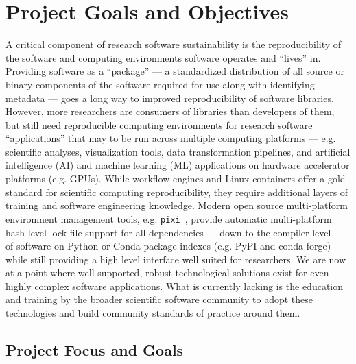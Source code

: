 \documentclass[letterpaper, 11pt]{article}
\newcommand{\pixi}{\texttt{pixi}}
\begin{document}
\pagestyle{fancy}

\section{Project Goals and Objectives}



A critical component of research software sustainability is the reproducibility of the software and computing environments software operates and ``lives'' in.
Providing software as a ``package'' --- a standardized distribution of all source or binary components of the software required for use along with identifying metadata --- goes a long way to improved reproducibility of software libraries.
However, more researchers are consumers of libraries than developers of them, but still need reproducible computing environments for research software ``applications'' that may to be run across multiple computing platforms --- e.g. scientific analyses, visualization tools, data transformation pipelines, and artificial intelligence (AI) and machine learning (ML) applications on hardware accelerator platforms (e.g. GPUs).
While workflow engines and Linux containers offer a gold standard for scientific computing reproducibility, they require additional layers of training and software engineering knowledge.
Modern open source multi-platform environment management tools, e.g. \pixi{}~\cite{Arts_pixi}, provide automatic multi-platform hash-level lock file support for all dependencies --- down to the compiler level --- of software on Python or Conda package indexes (e.g. PyPI and conda-forge) while still providing a high level interface well suited for researchers.
We are now at a point where well supported, robust technological solutions exist for even highly complex software applications.
What is currently lacking is the education and training by the broader scientific software community to adopt these technologies and build community standards of practice around them.

\subsection{Project Focus and Goals}
\end{document}
